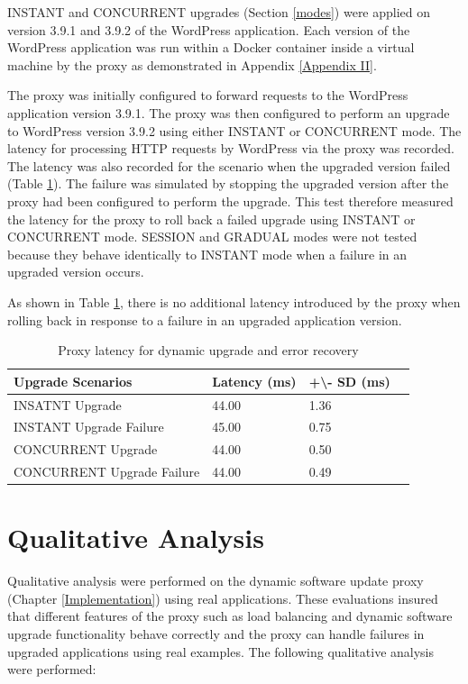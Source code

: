 \documentclass[a4paper,11pt,twoside]{report}
\begin{document}
INSTANT and CONCURRENT upgrades (Section \ref{modes}) were applied on version 3.9.1 and 3.9.2 of the WordPress application. Each version of the WordPress application was run within a Docker container inside a virtual machine by the proxy as demonstrated in Appendix \ref{Appendix II}.    

The proxy was initially configured to forward requests to the WordPress application version 3.9.1. The proxy was then configured to perform an upgrade to WordPress version 3.9.2 using either INSTANT or CONCURRENT mode. The latency for processing HTTP requests by WordPress via the proxy was recorded. The latency was also recorded for the scenario when the upgraded version failed (Table \ref{upgrade-speed}). The failure was simulated by stopping the upgraded version after the proxy had been configured to perform the upgrade. This test therefore measured the latency for the proxy to roll back a failed upgrade using INSTANT or CONCURRENT mode. SESSION and GRADUAL modes were not tested because they behave identically to INSTANT mode when a failure in an upgraded version occurs.

As shown in Table \ref{upgrade-speed}, there is no additional latency introduced by the proxy when rolling back in response to a failure in an upgraded application version. \\

\begin{table}[!h]
\caption {Proxy latency for dynamic upgrade and error recovery}
\label{upgrade-speed}
\begin{center}
    \begin{tabular}{ | l | l | l | p{5cm} |}
    \hline
   \textbf{Upgrade Scenarios} & \textbf{Latency (ms)} & \textbf{+\textbackslash }\textbf{- SD (ms)} \\ \hline
    INSATNT Upgrade & 44.00 &1.36 \\ \hline
    INSTANT Upgrade Failure & 45.00 & 0.75\\ \hline
    CONCURRENT Upgrade & 44.00 & 0.50\\ \hline
    CONCURRENT Upgrade Failure & 44.00 & 0.49\\
    \hline
    \end{tabular}
\end{center}
\end{table}

\section{Qualitative Analysis}
Qualitative analysis were performed on the dynamic software update proxy (Chapter \ref{Implementation})  using real applications. These evaluations insured that different features of the proxy such as load balancing and dynamic software upgrade functionality behave correctly and the proxy can handle failures in upgraded applications using real examples. The following qualitative analysis were performed: 
\end{document}
